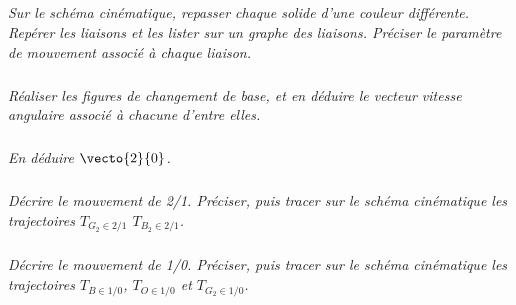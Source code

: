 \subparagraph{}
\textit{Sur le schéma cinématique, repasser chaque solide d’une couleur différente. Repérer les liaisons et les lister
sur un graphe des liaisons. Préciser le paramètre de mouvement associé à chaque liaison.}
\ifprof
\begin{corrige}
\end{corrige}
\else
\fi


\subparagraph{}
\textit{Réaliser les figures de changement de base, et en déduire le vecteur vitesse angulaire associé à chacune
d’entre elles.}
\ifprof
\begin{corrige}
\end{corrige}
\else
\fi


\subparagraph{}
\textit{En déduire $\vecto{2}{0}$.}
\ifprof
\begin{corrige}
\end{corrige}
\else
\fi



\subparagraph{}
\textit{Décrire le mouvement de 2/1. Préciser, puis tracer sur le schéma cinématique les trajectoires $T_{G_2\in 2/1}$
$T_{B_2\in 2/1}$.}
\ifprof
\begin{corrige}
\end{corrige}
\else
\fi

\subparagraph{}
\textit{Décrire le mouvement de 1/0. Préciser, puis tracer sur le schéma cinématique les trajectoires $T_{B\in 1/0}$, 
$T_{O\in 1/0}$ et $T_{G_2\in 1/0}$.}
\ifprof
\begin{corrige}
\end{corrige}
\else
\fi